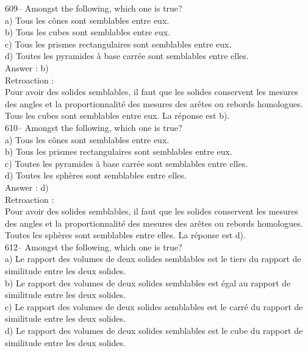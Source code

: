 ﻿\documentclass[letterpaper, 12pt]{article}
\begin{document}
609-- Amongst the following, which one is true?\\
a) Tous les c\^ones sont semblables entre eux.\\
b) Tous les cubes sont semblables entre eux.\\
c) Tous les prismes rectangulaires sont semblables entre eux.\\
d) Toutes les pyramides \`a base carr\'ee sont semblables entre elles.\\

Answer : b)\\

Retroaction : \\
Pour avoir des solides semblables, il faut que les solides conservent les
mesures des angles et la proportionnalit\'e des mesures des ar\^etes ou
rebords homologues.  Tous les cubes sont semblables entre eux.  La r\'eponse
est b).\\

610-- Amongst the following, which one is true?\\
a) Tous les c\^ones sont semblables entre eux.\\
b) Tous les prismes rectangulaires sont semblables entre eux.\\
c) Toutes les pyramides \`a base carr\'ee sont semblables entre elles.\\
d) Toutes les sph\`eres sont semblables entre elles.\\

Answer : d)\\

Retroaction : \\
Pour avoir des solides semblables, il faut que les solides conservent les
mesures des angles et la proportionnalit\'e des mesures des ar\^etes ou
rebords homologues.  Toutes les sph\`eres sont semblables entre elles.  La
r\'eponse est d).\\


612-- Amongst the following, which one is true?\\
a) Le rapport des volumes de deux solides semblables est le tiers du rapport
de similitude entre les deux solides.\\
b) Le rapport des volumes de deux solides semblables est \'egal au rapport
de similitude entre les deux solides.\\
c) Le rapport des volumes de deux solides semblables est le carr\'e du
rapport de similitude entre les deux solides.\\
d) Le rapport des volumes de deux solides semblables est le cube du rapport
de similitude entre les deux solides.\\
\end{document}
